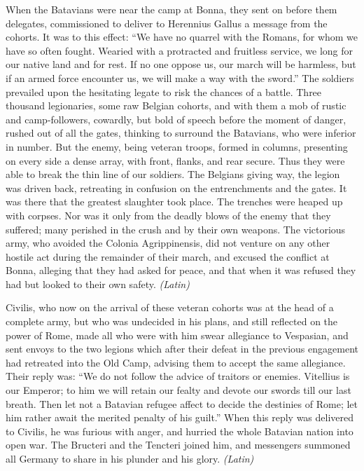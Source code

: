 When the Batavians were near the camp at Bonna, they sent on before them delegates, commissioned to deliver to Herennius Gallus a message from the cohorts. It was to this effect: ``We have no quarrel with the Romans, for whom we have so often fought. Wearied with a protracted and fruitless service, we long for our native land and for rest. If no one oppose us, our march will be harmless, but if an armed force encounter us, we will make a way with the sword.'' The soldiers prevailed upon the hesitating legate to risk the chances of a battle. Three thousand legionaries, some raw Belgian cohorts, and with them a mob of rustic and camp-followers, cowardly, but bold of speech before the moment of danger, rushed out of all the gates, thinking to surround the Batavians, who were inferior in number. But the enemy, being veteran troops, formed in columns, presenting on every side a dense array, with front, flanks, and rear secure. Thus they were able to break the thin line of our soldiers. The Belgians giving way, the legion was driven back, retreating in confusion on the entrenchments and the gates. It was there that the greatest slaughter took place. The trenches were heaped up with corpses. Nor was it only from the deadly blows of the enemy that they suffered; many perished in the crush and by their own weapons. The victorious army, who avoided the Colonia Agrippinensis, did not venture on any other hostile act during the remainder of their march, and excused the conflict at Bonna, alleging that they had asked for peace, and that when it was refused they had but looked to their own safety. \emph{(Latin)}


Civilis, who now on the arrival of these veteran cohorts was at the head of a complete army, but who was undecided in his plans, and still reflected on the power of Rome, made all who were with him swear allegiance to Vespasian, and sent envoys to the two legions which after their defeat in the previous engagement had retreated into the Old Camp, advising them to accept the same allegiance. Their reply was: ``We do not follow the advice of traitors or enemies. Vitellius is our Emperor; to him we will retain our fealty and devote our swords till our last breath. Then let not a Batavian refugee affect to decide the destinies of Rome; let him rather await the merited penalty of his guilt.'' When this reply was delivered to Civilis, he was furious with anger, and hurried the whole Batavian nation into open war. The Bructeri and the Tencteri joined him, and messengers summoned all Germany to share in his plunder and his glory. \emph{(Latin)}

